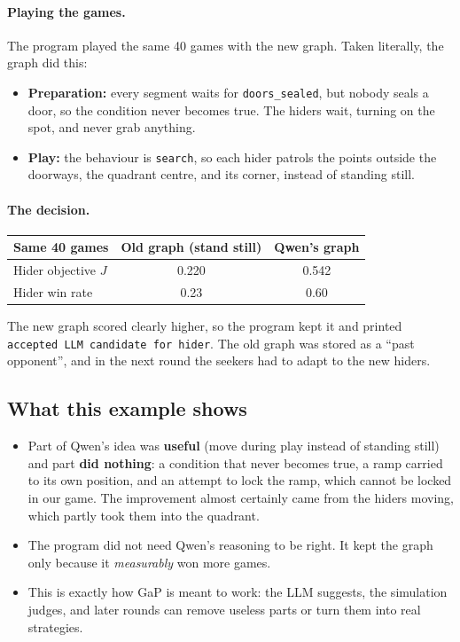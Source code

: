 \documentclass[11pt]{article}
\begin{document}
\paragraph{Playing the games.} The program played the same 40 games with the new
graph. Taken literally, the graph did this:
\begin{itemize}
  \item \textbf{Preparation:} every segment waits for \texttt{doors\_sealed},
  but nobody seals a door, so the condition never becomes true. The hiders wait,
  turning on the spot, and never grab anything.
  \item \textbf{Play:} the behaviour is \texttt{search}, so each hider patrols
  the points outside the doorways, the quadrant centre, and its corner, instead
  of standing still.
\end{itemize}

\paragraph{The decision.}

\begin{center}
\begin{tabular}{lcc}
  \toprule
  Same 40 games & Old graph (stand still) & Qwen's graph \\
  \midrule
  Hider objective $J$ & 0.220 & 0.542 \\
  Hider win rate      & 0.23  & 0.60  \\
  \bottomrule
\end{tabular}
\end{center}

\noindent The new graph scored clearly higher, so the program kept it and printed
\texttt{accepted LLM candidate for hider}. The old graph was stored as a ``past
opponent'', and in the next round the seekers had to adapt to the new hiders.

\subsection{What this example shows}

\begin{itemize}
  \item Part of Qwen's idea was \textbf{useful} (move during play instead of
  standing still) and part \textbf{did nothing}: a condition that never becomes
  true, a ramp carried to its own position, and an attempt to lock the ramp,
  which cannot be locked in our game. The improvement almost certainly came from
  the hiders moving, which partly took them into the quadrant.
  \item The program did not need Qwen's reasoning to be right. It kept the graph
  only because it \emph{measurably} won more games.
  \item This is exactly how GaP is meant to work: the LLM suggests, the
  simulation judges, and later rounds can remove useless parts or turn them into
  real strategies.
\end{itemize}
\end{document}
